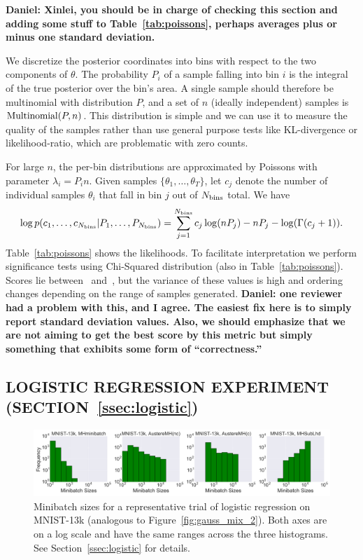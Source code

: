 \documentclass[letterpaper]{article}
\begin{document}
\textbf{Daniel: Xinlei, you should be in charge of checking this section and
adding some stuff to Table~\ref{tab:poissons}, perhaps averages plus or minus
one standard deviation.}

We discretize the posterior coordinates into bins with respect to the two
components of $\theta$.  The probability $P_i$ of a sample falling into bin $i$
is the integral of the true posterior over the bin's area.  A single sample
should therefore be multinomial with distribution $P$, and a set of $n$ (ideally
independent) samples is ${\rm Multinomial}(P,n)$. This distribution is simple
and we can use it to measure the quality of the samples rather than use general
purpose tests like KL-divergence or likelihood-ratio, which are problematic with
zero counts.

For large $n$, the per-bin distributions are approximated by Poissons with
parameter $\lambda_i=P_i n$. Given samples $\{\theta_1,\ldots,\theta_T\}$, let
$c_j$ denote the number of individual samples $\theta_i$ that fall in bin $j$
out of $N_{\rm bins}$ total. We have
\begin{equation}\label{eq:log_prob_poissons}
\log p(c_1, \ldots, c_{N_{\rm bins}} | P_1, \ldots, P_{N_{\rm bins}}) =
\sum_{j=1}^{N_{\rm bins}} c_j \log (n P_j) - n P_j - \log(\Gamma(c_j+1)).
\end{equation}
Table~\ref{tab:poissons} shows the likelihoods. To facilitate interpretation we
perform significance tests using Chi-Squared distribution (also in
Table~\ref{tab:poissons}). Scores lie between~\citep{cutting_mh_2014}
and~\citep{icml2014c1_bardenet14}, but the variance of these values is high and
ordering changes depending on the range of samples generated. \textbf{Daniel:
one reviewer had a problem with this, and I agree. The easiest fix here is to
simply report standard deviation values. Also, we should emphasize that we are
not aiming to get the best score by this metric but simply something that
exhibits some form of ``correctness.''}

\subsection{LOGISTIC REGRESSION EXPERIMENT (SECTION~\ref{ssec:logistic})}\label{app:logistic}

\begin{figure}[t]
	\centering
    \includegraphics[width=0.9\linewidth]{logistic_regression_histograms_mnist.png}
	\caption{
    Minibatch sizes for a representative trial of logistic regression on
    MNIST-13k (analogous to Figure~\ref{fig:gauss_mix_2}). Both axes are on a
    log scale and have the same ranges across the three histograms. See
    Section~\ref{ssec:logistic} for details.
    }
	\label{fig:logistic_histograms_mnist}
\end{figure}
\end{document}
